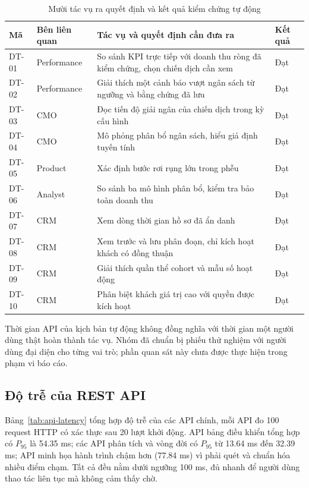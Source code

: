 \begin{table}[H]
\centering
\caption{Mười tác vụ ra quyết định và kết quả kiểm chứng tự động}
\label{tab:decision-tasks}
\footnotesize
\renewcommand{\arraystretch}{1.2}
\begin{tabularx}{\textwidth}{>{\raggedright\arraybackslash}p{1.25cm} >{\raggedright\arraybackslash}p{2.2cm} >{\raggedright\arraybackslash}X >{\centering\arraybackslash}p{1.6cm}}
\toprule
\textbf{Mã} & \textbf{Bên liên quan} & \textbf{Tác vụ và quyết định cần đưa ra} & \textbf{Kết quả} \\
\midrule
DT-01 & Performance & So sánh KPI trực tiếp với doanh thu ròng đã kiểm chứng, chọn chiến dịch cần xem & Đạt \\
DT-02 & Performance & Giải thích một cảnh báo vượt ngân sách từ ngưỡng và bằng chứng đã lưu & Đạt \\
DT-03 & CMO & Đọc tiến độ giải ngân của chiến dịch trong kỳ cấu hình & Đạt \\
DT-04 & CMO & Mô phỏng phân bổ ngân sách, hiểu giả định tuyến tính & Đạt \\
DT-05 & Product & Xác định bước rơi rụng lớn trong phễu & Đạt \\
DT-06 & Analyst & So sánh ba mô hình phân bổ, kiểm tra bảo toàn doanh thu & Đạt \\
DT-07 & CRM & Xem dòng thời gian hồ sơ đã ẩn danh & Đạt \\
DT-08 & CRM & Xem trước và lưu phân đoạn, chỉ kích hoạt khách có đồng thuận & Đạt \\
DT-09 & CRM & Giải thích quần thể cohort và mẫu số hoạt động & Đạt \\
DT-10 & CRM & Phân biệt khách giá trị cao với quyền được kích hoạt & Đạt \\
\bottomrule
\end{tabularx}
\end{table}

Thời gian API của kịch bản tự động không đồng nghĩa với thời gian một người dùng thật hoàn thành tác vụ. Nhóm đã chuẩn bị phiếu thử nghiệm với người dùng đại diện cho từng vai trò; phần quan sát này chưa được thực hiện trong phạm vi báo cáo.

\subsection{Độ trễ của REST API}
\label{sec:c5-api-latency}
Bảng~\ref{tab:api-latency} tổng hợp độ trễ của các API chính, mỗi API đo 100 request HTTP có xác thực sau 20 lượt khởi động. API bảng điều khiển tổng hợp có $P_{95}$ là \num{54.35} ms; các API phân tích và vòng đời có $P_{95}$ từ \num{13.64} ms đến \num{32.39} ms; API minh họa hành trình chậm hơn (\num{77.84} ms) vì phải quét và chuẩn hóa nhiều điểm chạm. Tất cả đều nằm dưới ngưỡng 100 ms, đủ nhanh để người dùng thao tác liên tục mà không cảm thấy chờ.

